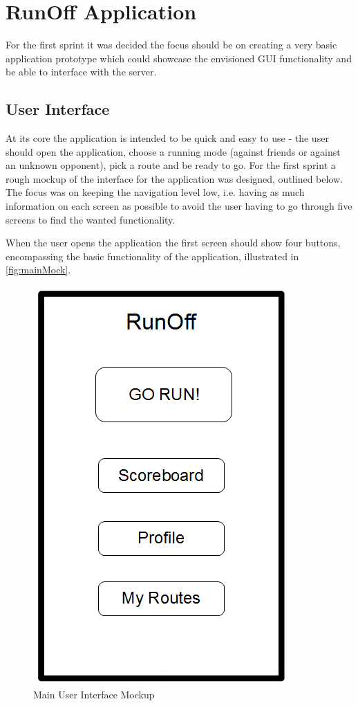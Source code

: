 \section{RunOff Application}
For the first sprint it was decided the focus should be on creating a very basic application prototype which could showcase the envisioned \ac{GUI} functionality and be able to interface with the server. 

\subsection{User Interface}
At its core the application is intended to be quick and easy to use - the user should open the application, choose a running mode (against friends or against an unknown opponent), pick a route and be ready to go. For the first sprint a rough mockup of the interface for the application was designed, outlined below. The focus was on keeping the navigation level low, i.e. having as much information on each screen as possible to avoid the user having to go through five screens to find the wanted functionality.

When the user opens the application the first screen should show four buttons, encompassing the basic functionality of the application, illustrated in \autoref{fig:mainMock}.

\begin{figure}[!ht]
	\begin{center}
		\includegraphics[scale=0.4]{img/mainMockV1.png}
		\caption{Main User Interface Mockup}
		\label{fig:mainMock}
	\end{center}
\end{figure}

